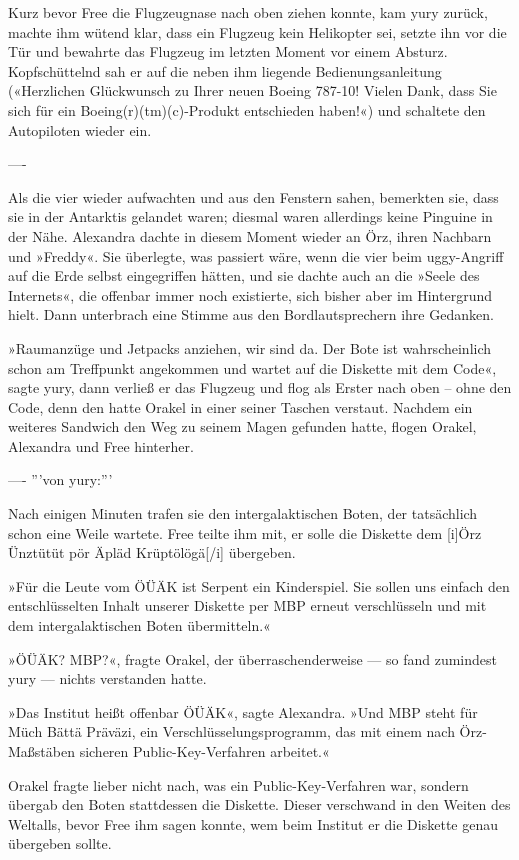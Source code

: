Kurz bevor Free die Flugzeugnase nach oben ziehen konnte, kam yury zurück, machte ihm wütend klar, dass ein Flugzeug kein Helikopter sei, setzte ihn vor die Tür und bewahrte das Flugzeug im letzten Moment vor einem Absturz. Kopfschüttelnd sah er auf die neben ihm liegende Bedienungsanleitung («Herzlichen Glückwunsch zu Ihrer neuen Boeing 787-10! Vielen Dank, dass Sie sich für ein Boeing(r)(tm)(c)-Produkt entschieden haben!«) und schaltete den Autopiloten wieder ein.

----

Als die vier wieder aufwachten und aus den Fenstern sahen, bemerkten sie, dass sie in der Antarktis gelandet waren; diesmal waren allerdings keine Pinguine in der Nähe. Alexandra dachte in diesem Moment wieder an Örz, ihren Nachbarn und »Freddy«. Sie überlegte, was passiert wäre, wenn die vier beim uggy-Angriff auf die Erde selbst eingegriffen hätten, und sie dachte auch an die »Seele des Internets«, die offenbar immer noch existierte, sich bisher aber im Hintergrund hielt.  Dann unterbrach eine Stimme aus den Bordlautsprechern ihre Gedanken.

»Raumanzüge und Jetpacks anziehen, wir sind da. Der Bote ist wahrscheinlich schon am Treffpunkt angekommen und wartet auf die Diskette mit dem Code«, sagte yury, dann verließ er das Flugzeug und flog als Erster nach oben – ohne den Code, denn den hatte Orakel in einer seiner Taschen verstaut. Nachdem ein weiteres Sandwich den Weg zu seinem Magen gefunden hatte, flogen Orakel, Alexandra und Free hinterher.

----
'''von yury:'''

Nach einigen Minuten trafen sie den intergalaktischen Boten, der tatsächlich schon eine Weile wartete. Free teilte ihm mit, er solle die Diskette dem [i]Örz Ünztütüt pör Äpläd Krüptölögä[/i] übergeben.

»Für die Leute vom ÖÜÄK ist Serpent ein Kinderspiel. Sie sollen uns einfach den entschlüsselten Inhalt unserer Diskette per MBP erneut verschlüsseln und mit dem intergalaktischen Boten übermitteln.«

»ÖÜÄK? MBP?«, fragte Orakel, der überraschenderweise — so fand zumindest yury — nichts verstanden hatte.

»Das Institut heißt offenbar ÖÜÄK«, sagte Alexandra. »Und MBP steht für Müch Bättä Präväzi, ein Verschlüsselungsprogramm, das mit einem nach Örz-Maßstäben sicheren Public-Key-Verfahren arbeitet.«

Orakel fragte lieber nicht nach, was ein Public-Key-Verfahren war, sondern übergab den Boten stattdessen die Diskette. Dieser verschwand in den Weiten des Weltalls, bevor Free ihm sagen konnte, wem beim Institut er die Diskette genau übergeben sollte.

